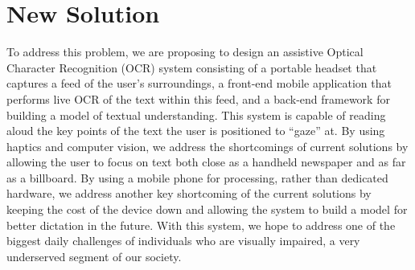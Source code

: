 \section{New Solution}

To address this problem, we are proposing to design an assistive Optical Character Recognition (OCR) system consisting of a portable headset that captures a feed of the user's surroundings, a front-end mobile application that performs live OCR of the text within this feed, and a back-end framework for building a model of textual understanding. This system is capable of reading aloud the key points of the text the user is positioned to “gaze” at. By using haptics and computer vision, we address the shortcomings of current solutions by allowing the user to focus on text both close as a handheld newspaper and as far as a billboard. By using a mobile phone for processing, rather than dedicated hardware, we address another key shortcoming of the current solutions by keeping the cost of the device down and allowing the system to build a model for better dictation in the future. With this system, we hope to address one of the biggest daily challenges of individuals who are visually impaired, a very underserved segment of our society.